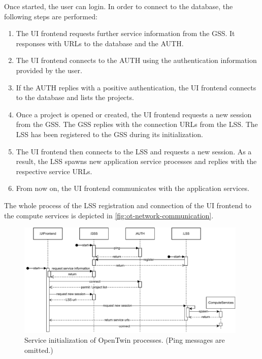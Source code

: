 Once started, the user can login. In order to connect to the database, the following steps are performed:
\begin{enumerate}
\item The \ac{UI} frontend requests further service information from the \ac{GSS}. It responses with \acp{URL} to the database and the \ac{AUTH}.
\item The \ac{UI} frontend connects to the \ac{AUTH} using the authentication information provided by the user.
\item If the \ac{AUTH} replies with a positive authentication, the \ac{UI} frontend connects to the database and lists the projects.
\item Once a project is opened or created, the \ac{UI} frontend requests a new session from the \ac{GSS}. The \ac{GSS} replies with the connection \acp{URL} from the \ac{LSS}. The \ac{LSS} has been registered to the \ac{GSS} during its initialization.
\item The \ac{UI} frontend then connects to the \ac{LSS} and requests a new session. As a result, the \ac{LSS} spawns new application service processes and replies with the respective service \acp{URL}.
\item From now on, the \ac{UI} frontend communicates with the application services.
\end{enumerate}
The whole process of the \ac{LSS} registration and connection of the \ac{UI} frontend to the compute services is depicted in \autoref{fig:ot-network-communication}.

\begin{figure}[h]
	\centering
	\includegraphics[width=0.98\textwidth]{Figures/opentwin-network-communication.pdf}
	\caption{Service initialization of OpenTwin processes. (Ping messages are omitted.)}
	\label{fig:ot-network-communication}
\end{figure}

